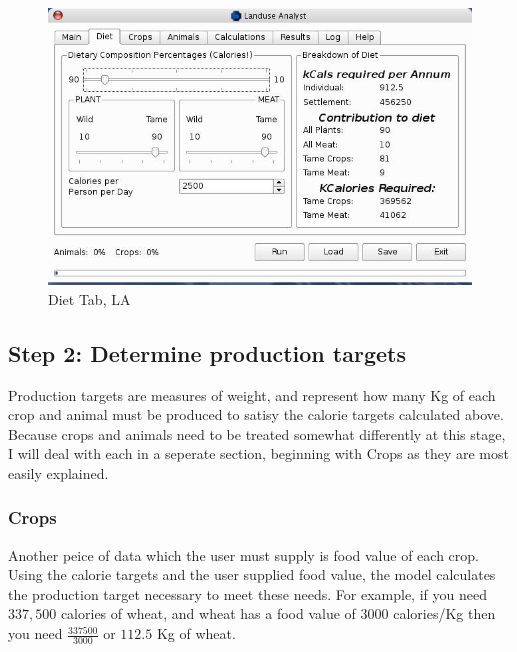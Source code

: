 \begin{figure}[htbp]
  \label{fig:LADiet}%
    \includegraphics[scale=.355]{./images/LanduseAnalystDiet545.jpg}
  \caption{ Diet Tab, LA}
\end{figure}

\subsection{Step 2: Determine production targets}
  Production targets are measures of weight, and represent how many Kg of each crop and animal must be produced to satisy the calorie targets calculated above.  Because crops and animals need to be treated somewhat differently at this stage, I will deal with each in a seperate section, beginning with Crops as they are most easily explained.

  \subsubsection{Crops}
  Another peice of data which the user must supply is food value of each crop.  Using the calorie targets and the user supplied food value, the model calculates the production target necessary to meet these needs.  For example, if you need $337,500$ calories of wheat, and wheat has a food value of $3000$ calories/Kg then you need $\frac{337500}{3000}$ or $112.5$ Kg of wheat.

